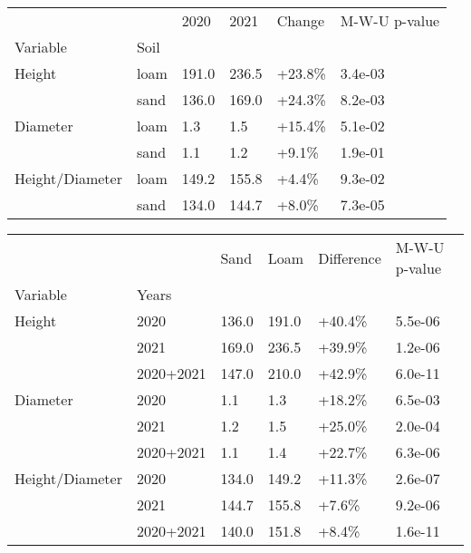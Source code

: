 \documentclass[11pt]{article}
\begin{document}
\begin{tabular}{llllll}
\toprule
                &      &   2020 &   2021 &  Change & M-W-U p-value \\
Variable & Soil &        &        &         &               \\
\midrule
Height & loam &  191.0 &  236.5 &  +23.8\% &       3.4e-03 \\
                & sand &  136.0 &  169.0 &  +24.3\% &       8.2e-03 \\
Diameter & loam &    1.3 &    1.5 &  +15.4\% &       5.1e-02 \\
                & sand &    1.1 &    1.2 &   +9.1\% &       1.9e-01 \\
Height/Diameter & loam &  149.2 &  155.8 &   +4.4\% &       9.3e-02 \\
                & sand &  134.0 &  144.7 &   +8.0\% &       7.3e-05 \\
\bottomrule
\end{tabular}

\begin{tabular}{llllll}
\toprule
                &           &   Sand &   Loam & Difference & M-W-U p-value \\
Variable & Years &        &        &            &               \\
\midrule
Height & 2020 &  136.0 &  191.0 &     +40.4\% &       5.5e-06 \\
                & 2021 &  169.0 &  236.5 &     +39.9\% &       1.2e-06 \\
                & 2020+2021 &  147.0 &  210.0 &     +42.9\% &       6.0e-11 \\
Diameter & 2020 &    1.1 &    1.3 &     +18.2\% &       6.5e-03 \\
                & 2021 &    1.2 &    1.5 &     +25.0\% &       2.0e-04 \\
                & 2020+2021 &    1.1 &    1.4 &     +22.7\% &       6.3e-06 \\
Height/Diameter & 2020 &  134.0 &  149.2 &     +11.3\% &       2.6e-07 \\
                & 2021 &  144.7 &  155.8 &      +7.6\% &       9.2e-06 \\
                & 2020+2021 &  140.0 &  151.8 &      +8.4\% &       1.6e-11 \\
\bottomrule
\end{tabular}
\end{document}
